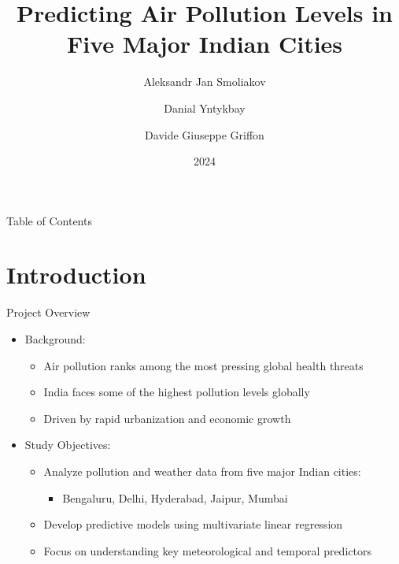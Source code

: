 \documentclass[svgnames, 10pt]{beamer}
\title[Air Pollution in India]{Predicting Air Pollution Levels in Five Major Indian Cities}
\author{Aleksandr Jan Smoliakov \and Danial Yntykbay \and Davide Giuseppe Griffon}
\institute[VU]{Data Science Study Programme\\Faculty of Mathematics and Informatics}
\date{2024}
\begin{document}
\begin{frame}
\titlepage
\end{frame}

\begin{frame}{Table of Contents}
\tableofcontents
\end{frame}

\section{Introduction}

\begin{frame}{Project Overview}
    \begin{itemize}
        \item Background:
            \begin{itemize}
                \item Air pollution ranks among the most pressing global health threats
                \item India faces some of the highest pollution levels globally
                \item Driven by rapid urbanization and economic growth
            \end{itemize}
        \vspace{1em}
        \item Study Objectives:
            \begin{itemize}
                \item Analyze pollution and weather data from five major Indian cities:
                    \begin{itemize}
                        \item Bengaluru, Delhi, Hyderabad, Jaipur, Mumbai
                    \end{itemize}
                \item Develop predictive models using multivariate linear regression
                \item Focus on understanding key meteorological and temporal predictors
            \end{itemize}
    \end{itemize}
    \vfill
 \end{frame}
\end{document}
